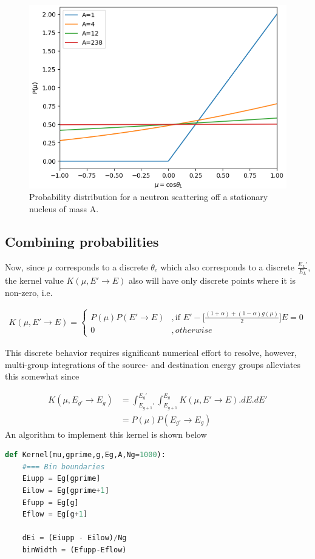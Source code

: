 \documentclass[11pt,letterpaper,titlepage]{article}
\newcommand{\beq}{\begin{equation*}
\begin{aligned}}
\newcommand{\eeq}{\end{aligned}
\end{equation*}}
\numberwithin{equation}{section}
\begin{document}
\begin{appendices}
\begin{figure}[H]
\centering
\includegraphics[width=0.7\linewidth]{ScatProbvsA}
\caption{Probability distribution for a neutron scattering off a stationary nucleus of mass A.}
\label{fig:scatproblevsa}
\end{figure}



\subsection{Combining probabilities}
Now, since $\mu$ corresponds to a discrete $\theta_c$ which also corresponds to a discrete $\frac{E_L'}{E_L}$, the kernel value $K(\mu,E'\to E)$ also will have only discrete points where it is non-zero, i.e.

\beq
K(\mu,E' \to E)=
\begin{cases}
P(\mu)P(E'\to E)    &, \text{if } E' - \biggr[
\frac{  (1+\alpha) + (1-\alpha) g(\mu)   }{2}
\biggr] E = 0 \\
0 &, otherwise
\end{cases}
\eeq 

This discrete behavior requires significant numerical effort to resolve, however, multi-group integrations of the source- and destination energy groups alleviates this somewhat since

\beq 
K(\mu,E_{g'} \to E_g) &=
\int_{E_{g+1}'}^{E_g'} \int_{E_{g+1}}^{E_g} K(\mu,E' \to E).dE.dE' \\
&=P(\mu)P(E_{g'}\to E_g) 
\eeq 
\newline
An algorithm to implement this kernel is shown below
\newpage
\begin{lstlisting}[language=python]
def Kernel(mu,gprime,g,Eg,A,Ng=1000):
    #=== Bin boundaries
    Eiupp = Eg[gprime]
    Eilow = Eg[gprime+1]
    Efupp = Eg[g]
    Eflow = Eg[g+1]
    
    dEi = (Eiupp - Eilow)/Ng
    binWidth = (Efupp-Eflow)
    

\end{lstlisting}
\end{appendices}
\end{document}
